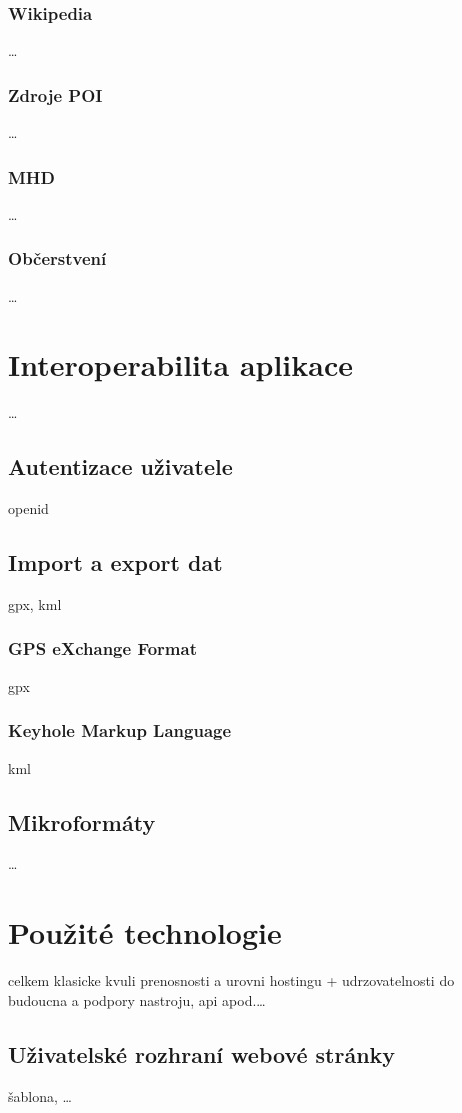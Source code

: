 \subsection{Wikipedia}
\ldots
\subsection{Zdroje POI}
\ldots
\subsection{MHD}
\ldots
\subsection{Občerstvení}
\ldots

\chapter{Interoperabilita aplikace}
\ldots

\section{Autentizace uživatele}
openid

\section{Import a export dat}
gpx, kml
\subsection{GPS eXchange Format}
gpx
\subsection{Keyhole Markup Language}
kml

\section{Mikroformáty}
\ldots

\chapter{Použité technologie}
celkem klasicke kvuli prenosnosti a urovni hostingu +
udrzovatelnosti do budoucna a podpory nastroju, api apod.\ldots

\section{Uživatelské rozhraní webové stránky}
šablona, \ldots
